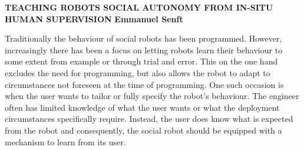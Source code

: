 \textbf{TEACHING ROBOTS SOCIAL AUTONOMY FROM IN-SITU HUMAN SUPERVISION}\newline
\textbf{Emmanuel Senft}

Traditionally the behaviour of social robots has been programmed. However, increasingly there has been a focus on letting robots learn their behaviour to some extent from example or through trial and error. This on the one hand excludes the need for programming, but also allows the robot to adapt to circumstances not foreseen at the time of programming. One such occasion is when the user wants to tailor or fully specify the robot’s behaviour. The engineer often has limited knowledge of what the user wants or what the deployment circumstances specifically require. Instead, the user does know what is expected from the robot and consequently, the social robot should be equipped with a mechanism to learn from its user.

